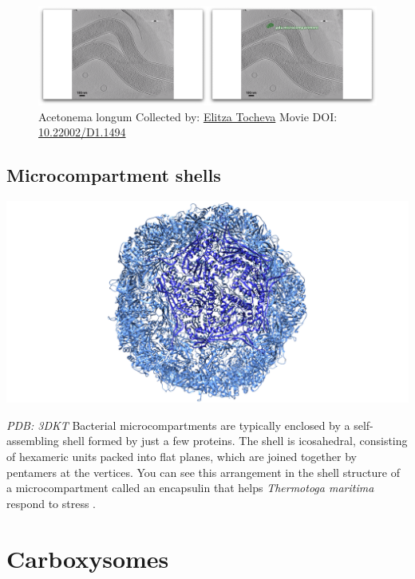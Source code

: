 \documentclass[]{tufte-book}
\begin{document}
\begin{figure}
\includegraphics{movie_stills/4_6} \caption[Acetonema longum Collected by:
\protect\hyperlink{elitza_tocheva}{Elitza Tocheva} Movie DOI:
\href{https://doi.org/10.22002/D1.1494}{10.22002/D1.1494}]{Acetonema longum Collected by:
\protect\hyperlink{elitza_tocheva}{Elitza Tocheva} Movie DOI:
\href{https://doi.org/10.22002/D1.1494}{10.22002/D1.1494}}\label{fig:4-6}
\end{figure}

\subsection{Microcompartment shells}\label{Microcompartment_shells}

\includegraphics{img/schematics/4_6_1}

\emph{PDB: 3DKT} Bacterial microcompartments are typically enclosed by a
self-assembling shell formed by just a few proteins. The shell is
icosahedral, consisting of hexameric units packed into flat planes,
which are joined together by pentamers at the vertices. You can see this
arrangement in the shell structure of a microcompartment called an
encapsulin that helps \emph{Thermotoga maritima} respond to stress
\citep{sutter2008}.

\section{Carboxysomes}\label{carboxysomes}
\end{document}
